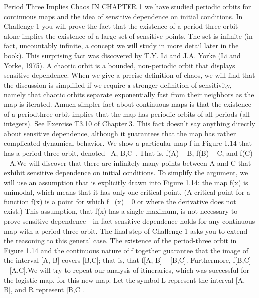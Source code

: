 \documentclass{article}
\begin{document}
Period Three Implies Chaos
IN CHAPTER 1 we have studied periodic orbits for continuous maps and the
idea of sensitive dependence on initial conditions. In Challenge 1 you will prove
the fact that the existence of a period-three orbit alone implies the existence of
a large set of sensitive points. The set is infinite (in fact, uncountably infinite, a
concept we will study in more detail later in the book). This surprising fact was
discovered by T.Y. Li and J.A. Yorke (Li and Yorke, 1975).
A chaotic orbit is a bounded, non-periodic orbit that displays sensitive
dependence. When we give a precise definition of chaos, we will find that the
discussion is simplified if we require a stronger definition of sensitivity, namely
that chaotic orbits separate exponentially fast from their neighbors as the map is
iterated.
Amuch simpler fact about continuous maps is that the existence of a periodthree
orbit implies that the map has periodic orbits of all periods (all integers).
See Exercise T3.10 of Chapter 3. This fact doesn’t say anything directly about
sensitive dependence, although it guarantees that the map has rather complicated
dynamical behavior.
We show a particular map f in Figure 1.14 that has a period-three orbit,
denoted  A, B,C . That is, f(A)   B, f(B)   C, and f(C)   A.We will discover
that there are infinitely many points between A and C that exhibit sensitive
dependence on initial conditions. To simplify the argument, we will use an assumption
that is explicitly drawn into Figure 1.14: the map f(x) is unimodal,
which means that it has only one critical point. (A critical point for a function
f(x) is a point for which f  (x)   0 or where the derivative does not exist.) This
assumption, that f(x) has a single maximum, is not necessary to prove sensitive
dependence—in fact sensitive dependence holds for any continuous map with a
period-three orbit. The final step of Challenge 1 asks you to extend the reasoning
to this general case.
The existence of the period-three orbit in Figure 1.14 and the continuous
nature of f together guarantee that the image of the interval [A, B] covers [B,C];
that is, that f[A, B]   [B,C]. Furthermore, f[B,C]   [A,C].We will try to repeat
our analysis of itineraries, which was successful for the logistic map, for this
new map. Let the symbol L represent the interval [A, B], and R represent [B,C].
\end{document}
